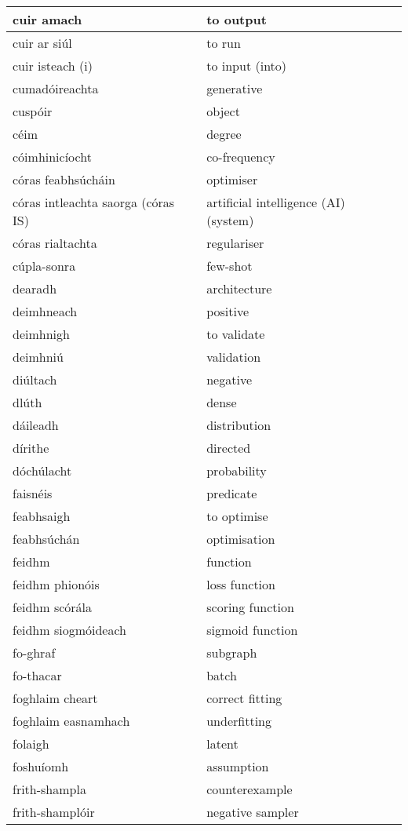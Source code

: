 \documentclass{article}
\begin{document}
\begin{longtable}{|l|l|}
		cuir amach&to output\\ \hline 
		cuir ar siúl&to run\\ \hline 
		cuir isteach (i)&to input (into)\\ \hline 
		cumadóireachta&generative\\ \hline 
		cuspóir&object\\ \hline 
		céim&degree\\ \hline 
		cóimhinicíocht&co-frequency\\ \hline 
		córas feabhsúcháin&optimiser\\ \hline 
		córas intleachta saorga (córas IS)&artificial intelligence (AI) (system)\\ \hline 
		córas rialtachta&regulariser\\ \hline 
		cúpla-sonra&few-shot\\ \hline 
		dearadh&architecture\\ \hline 
		deimhneach&positive\\ \hline 
		deimhnigh&to validate\\ \hline 
		deimhniú&validation\\ \hline 
		diúltach&negative\\ \hline 
		dlúth&dense\\ \hline 
		dáileadh&distribution\\ \hline 
		dírithe&directed\\ \hline 
		dóchúlacht&probability\\ \hline 
		faisnéis&predicate\\ \hline 
		feabhsaigh&to optimise\\ \hline 
		feabhsúchán&optimisation\\ \hline 
		feidhm&function\\ \hline 
		feidhm phionóis&loss function\\ \hline 
		feidhm scórála&scoring function\\ \hline 
		feidhm siogmóideach&sigmoid function\\ \hline 
		fo-ghraf&subgraph\\ \hline 
		fo-thacar&batch\\ \hline 
		foghlaim cheart&correct fitting\\ \hline 
		foghlaim easnamhach&underfitting\\ \hline 
		folaigh&latent\\ \hline 
		foshuíomh&assumption\\ \hline 
		frith-shampla&counterexample\\ \hline 
		frith-shamplóir&negative sampler\\ \hline 

\end{longtable}
\end{document}
